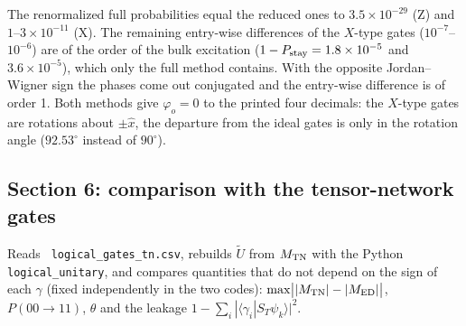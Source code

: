 \documentclass[11pt]{article}
\renewcommand{\code}[1]{\texttt{\hyphenchar\font=-1 #1}}
\newcommand{\bra}[1]{\langle#1|}
\begin{document}
The renormalized full probabilities equal the reduced ones to $3.5\times10^{-29}$ (Z) and $1$--$3\times10^{-11}$ (X). The remaining entry-wise
differences of the $X$-type gates ($10^{-7}$--$10^{-6}$) are of the order of the bulk excitation ($1 - P_{\rm stay} = 1.8\times10^{-5}$ and
$3.6\times10^{-5}$), which only the full method contains. With the opposite Jordan--Wigner sign the phases come out conjugated and the entry-wise
difference is of order 1. Both methods give $\varphi_o = 0$ to the printed four decimals: the $X$-type gates are rotations about $\pm\hat x$, the
departure from the ideal gates is only in the rotation angle ($92.53^\circ$ instead of $90^\circ$).

\subsection{Section 6: comparison with the tensor-network gates}

Reads \code{logical\_gates\_tn.csv}, rebuilds $\tilde U$ from $M_{\rm TN}$ with the Python \code{logical\_unitary}, and compares quantities that do
not depend on the sign of each $\gamma$ (fixed independently in the two codes): $\max\bigl||M_{\rm TN}| - |M_{\rm ED}|\bigr|$, $P(00\to11)$, $\theta$ and the
leakage $1 - \sum_i|\bra{\gamma_i}S_T\psi_k\rangle|^2$.

\begin{center}
\end{center}
\end{document}
